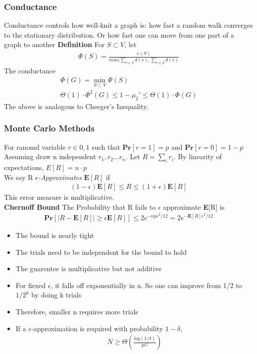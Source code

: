 \documentclass[12pt, letterpaper]{report}
\begin{document}
    \subsubsection{Conductance}
    Conductance controls how well-knit a graph is: how fast a random walk converges to the stationary distribution.
    Or how fast one can move from one part of a graph to another
    \textbf{Definition} For $S \subset V$, let
    \begin{gather*}
        \Phi(S) = \frac{e(S)}{min(\sum_{v \in S}d(v), \sum_{v\in \overline{S}}d(v)}
    \end{gather*}
    The conductance 
    \begin{gather*}
        \Phi(G) = \min_{S\subset V}\Phi(S)\\
        \Theta(1)\cdot\Phi^{2}(G) \leq 1-\mu_2'\leq\Theta(1)\cdot\Phi(G)
    \end{gather*}
    The above is analogous to Cheeger's Inequality.
    \subsubsection{Monte Carlo Methods}
    For ranomd variable $r\in{0,1}$ such that $\mathbf{Pr}[r=1]=p$ and $\mathbf{Pr}[r=0]=1-p$
    Assuming draw n independent $r_1,r_2\dots r_n$. Let $R =\sum_{i}r_i$. By linearity of expectations, $E[R]=n\cdot p$\\
    We  say R \textit{$\epsilon$-Approximates} $\mathbf{E}[R]$ if
    \begin{gather*}
        (1-\epsilon)\mathbf{E}[R]\leq R\leq (1+\epsilon)\mathbf{E}[R]
    \end{gather*}
    This error measure is multiplicative.\\
    \textbf{Chernoff Bound} The Probability that R fails to $\epsilon$ approximate \textbf{E}[R] is
    \begin{gather*}
        \mathbf{Pr}[|R-\mathbf{E}[R]| \geq \epsilon\mathbf{E}[R]] \leq 2e^{-np\epsilon ^{2}/12}=2e^{-\mathbf{E}[R]\epsilon^{2}/12}
    \end{gather*}
    \begin{itemize}
        \item The bound is nearly tight
        \item The trials need to be independent for the bound to hold
        \item The guarentee is multiplicative but not additive
        \item For fiexed $\epsilon$, it falls off exponentially in n. So one can improve from 1/2 to $1/2^k$ by doing
        k trials
        \item Therefore, smaller n requires more trials
        \item If a $\epsilon$-approximation is required with probability $1-\delta$,
        \begin{gather*}
            N\geq \Theta(\frac{log(1/\delta)}{p\epsilon^{2}})
        \end{gather*}
    \end{itemize}
\end{document}
